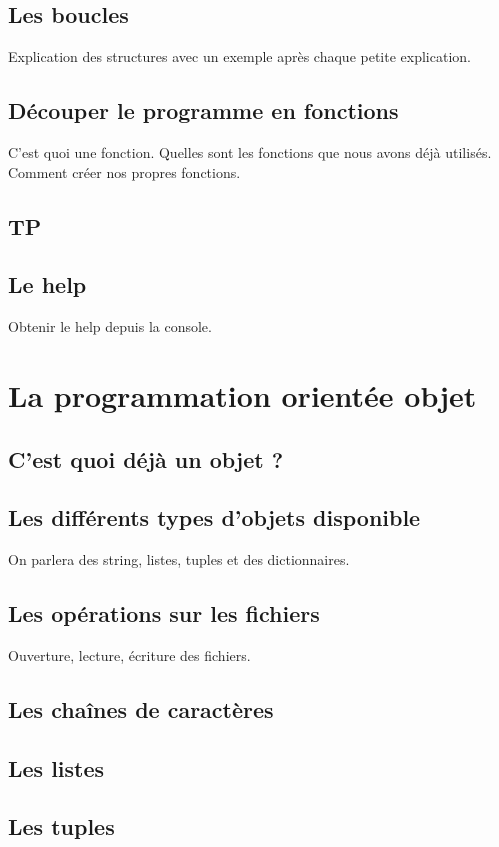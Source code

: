 \documentclass[12pt]{article}
\begin{document}
    \subsection{Les boucles}
        Explication des structures avec un exemple après chaque petite explication.
    \subsection{Découper le programme en fonctions}
        C'est quoi une fonction. Quelles sont les fonctions que nous avons déjà utilisés. Comment créer nos propres
        fonctions.
    \subsection{TP}
    \subsection{Le help}
        Obtenir le help depuis la console.

\section{La programmation orientée objet}
    \subsection{C'est quoi déjà un objet ?}
    \subsection{Les différents types d'objets disponible}
        On parlera des string, listes, tuples et des dictionnaires.
    \subsection{Les opérations sur les fichiers}
        Ouverture, lecture, écriture des fichiers.
    \subsection{Les chaînes de caractères}
    \subsection{Les listes}
    \subsection{Les tuples}
\end{document}
